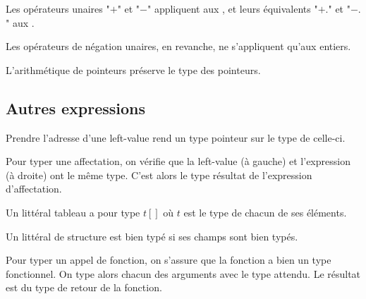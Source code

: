 Les opérateurs unaires "$+$" et "$-$" appliquent aux \tInt, et leurs équivalents
"$+.$" et "$-.$" aux \tFloat.


Les opérateurs de négation unaires, en revanche, ne s'appliquent qu'aux
entiers.

\begin{mathpar}
\end{mathpar}

L'arithmétique de pointeurs préserve le type des pointeurs.

\begin{mathpar}
\end{mathpar}

\subsection*{Autres expressions}

Prendre l'adresse d'une left-value rend un type pointeur sur le type de
celle-ci.

\begin{mathpar}
\end{mathpar}

Pour typer une affectation, on vérifie que la left-value (à gauche) et
l'expression (à droite) ont le même type. C'est alors le type résultat de
l'expression d'affectation.

\begin{mathpar}
\end{mathpar}

Un littéral tableau a pour type $t[]$ où $t$ est le type de chacun de ses
éléments.

\begin{mathpar}
\end{mathpar}

Un littéral de structure est bien typé si ses champs sont bien typés.

\begin{mathpar}
\end{mathpar}

Pour typer un appel de fonction, on s'assure que la fonction a bien un type
fonctionnel. On type alors chacun des arguments avec le type attendu. Le
résultat est du type de retour de la fonction.

